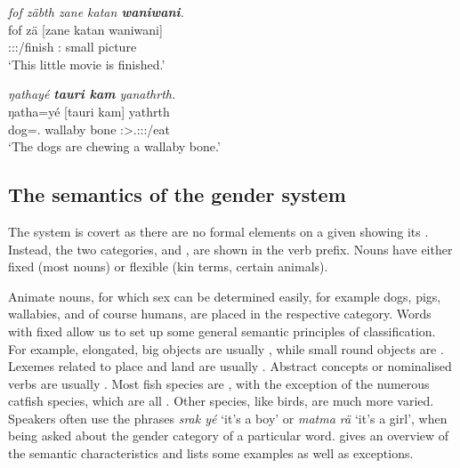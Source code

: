 \begin{exe}
	\ex \emph{fof zäbth zane katan \textbf{waniwani}.}\\
	\gll fof zä [zane katan waniwani]\\
	{\Emph} \Stsg:\Sbj:\Rpst:\Pfv/finish \Dem:{\Prox} small {picture}\\
	\trans `This little movie is finished.' 
	\label{ex046}
\end{exe}
\begin{exe}
	\ex \emph{ŋathayé \textbf{tauri kam} yanathrth.}\\
	\gll ŋatha=yé [tauri kam] yathrth\\
	dog=\Erg.{\Nsg} wallaby bone \Stpl:\Sbj>\Tsg.\Masc:\Obj:\Nonpast:\Ipfv/eat\\
	\trans `The dogs are chewing a wallaby bone.' 
	\label{ex047}
\end{exe}

\subsection{The semantics of the gender system}\label{gender-system-sec}

The  system is covert as there are no formal elements on a given  showing its . Instead, the two categories,  and , are shown in the verb prefix. Nouns have either fixed  (most nouns) or flexible  (kin terms, certain animals).

Animate nouns, for which sex can be determined easily, for example dogs, pigs, wallabies, and of course humans, are placed in the respective category. Words with fixed  allow us to set up some general semantic principles of classification. For example, elongated, big objects are usually , while small round objects are . Lexemes related to place and land are usually . Abstract concepts or nominalised verbs are usually . Most fish species are , with the exception of the numerous catfish species, which are all . Other species, like birds, are much more varied. Speakers often use the phrases \emph{srak yé} `it's a boy' or \emph{matma rä} `it's a girl', when being asked about the gender category of a particular word.  gives an overview of the semantic characteristics and lists some examples as well as exceptions.

